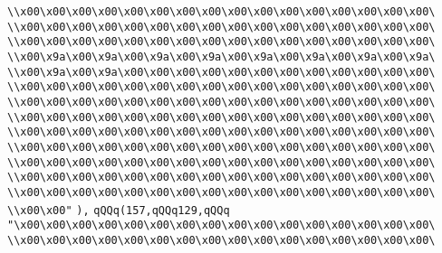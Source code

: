 \verb|\\x00\x00\x00\x00\x00\x00\x00\x00\x00\x00\x00\x00\x00\x00\x00\x00\|\newline
\verb|\\x00\x00\x00\x00\x00\x00\x00\x00\x00\x00\x00\x00\x00\x00\x00\x00\|\newline
\verb|\\x00\x00\x00\x00\x00\x00\x00\x00\x00\x00\x00\x00\x00\x00\x00\x00\|\newline
\verb|\\x00\x9a\x00\x9a\x00\x9a\x00\x9a\x00\x9a\x00\x9a\x00\x9a\x00\x9a\|\newline
\verb|\\x00\x9a\x00\x9a\x00\x00\x00\x00\x00\x00\x00\x00\x00\x00\x00\x00\|\newline
\verb|\\x00\x00\x00\x00\x00\x00\x00\x00\x00\x00\x00\x00\x00\x00\x00\x00\|\newline
\verb|\\x00\x00\x00\x00\x00\x00\x00\x00\x00\x00\x00\x00\x00\x00\x00\x00\|\newline
\verb|\\x00\x00\x00\x00\x00\x00\x00\x00\x00\x00\x00\x00\x00\x00\x00\x00\|\newline
\verb|\\x00\x00\x00\x00\x00\x00\x00\x00\x00\x00\x00\x00\x00\x00\x00\x00\|\newline
\verb|\\x00\x00\x00\x00\x00\x00\x00\x00\x00\x00\x00\x00\x00\x00\x00\x00\|\newline
\verb|\\x00\x00\x00\x00\x00\x00\x00\x00\x00\x00\x00\x00\x00\x00\x00\x00\|\newline
\verb|\\x00\x00\x00\x00\x00\x00\x00\x00\x00\x00\x00\x00\x00\x00\x00\x00\|\newline
\verb|\\x00\x00\x00\x00\x00\x00\x00\x00\x00\x00\x00\x00\x00\x00\x00\x00\|\newline
\verb|\\x00\x00"|\newline
\verb|),|\newline
\verb|qQQq(157,qQQq129,qQQq|\newline
\verb|"\x00\x00\x00\x00\x00\x00\x00\x00\x00\x00\x00\x00\x00\x00\x00\x00\|\newline
\verb|\\x00\x00\x00\x00\x00\x00\x00\x00\x00\x00\x00\x00\x00\x00\x00\x00\|\newline
